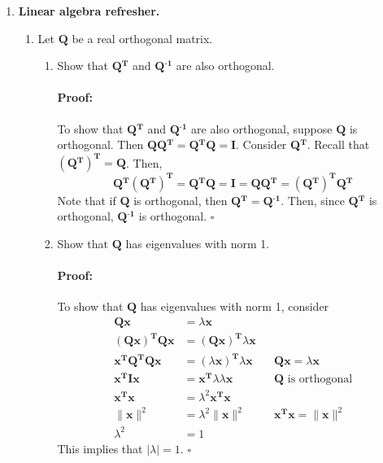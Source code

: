 \documentclass [11pt] {article}
\newcommand{\T}{\bf{T}}
\newcommand{\x}{\bf{x}}
\newcommand{\QT}{\bf{Q$^{\bf{T}}$}}
\newcommand{\QI}{\bf{Q$^{\bf{-1}}$}}
\newcommand{\QQ}{\bf{Q}}
\newenvironment{proof}{\vspace{-10pt}\paragraph{Proof:}}{\hfill$\square$}
\renewcommand{\bf}[1]{\textbf{{#1}}}
\begin{document}
\begin{enumerate}
    \item \bf{Linear algebra refresher.}
        \begin{enumerate}
            \item 
                Let $\QQ$ be a real orthogonal matrix.
                \begin{enumerate}[itemsep=10pt]
                    \item Show that $\QT$ and $\QI$ are also orthogonal.
                        \begin{proof}
                            To show that $\QT$ and $\QI$ are also orthogonal, suppose $\QQ$ is 
                            orthogonal. Then $\QQ \QT = \QT \QQ = \bf{I}$. Consider \QT. 
                            Recall that $\left(\QT\right)^{\bf{T}} = \QQ$. Then,
                            \[\QT \left( \QT \right)^{\T} = \QT \QQ = \bf{I} = \QQ \QT = \left( \QT \right)^{\T} \QT\]
                            Note that if $\QQ$ is orthogonal, then $\QT = \QI$. Then, since $\QT$ is 
                            orthogonal, $\QI$ is orthogonal.
                        \end{proof}

                    \item Show that $\QQ$ has eigenvalues with norm 1.
                        \begin{proof}
                            To show that $\QQ$ has eigenvalues with norm 1, consider
                            \begin{align*}
                                \QQ \x &= \lambda \x \\
                                \left( \QQ \x \right)^{\T} \QQ \x &= \left( \QQ \x \right)^{\T} \lambda \x \\
                                \x^{\T} \QQ^{\T} \QQ \x &= \left( \lambda \x \right)^{\T} \lambda \x && \QQ \x = \lambda \x \\
                                \x^{\T} \bf{I} \x &= \x^{\T} \lambda \lambda \x && \text{$\QQ$ is orthogonal} \\
                                \x^{\T} \x &= \lambda^2 \x^{\T} \x \\
                                \|\x\|^2 &= \lambda^2 \|\x\|^2 && \x^{\T} \x = \|\x\|^2 \\
                                \lambda^2 &= 1
                            \end{align*}
                            This implies that $|\lambda| = 1$.
                        \end{proof}


\end{enumerate}
\end{enumerate}
\end{enumerate}
\end{document}
